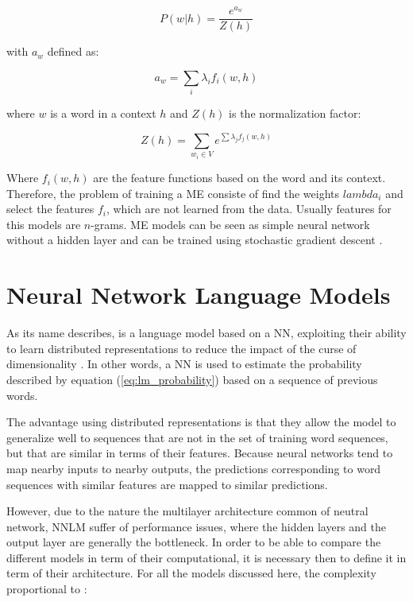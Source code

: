 \begin{equation}
  \label{eq:max-ent-prob}
   P(w|h) = \frac{e^{a_w}}{Z(h)}
\end{equation}

with $a_w$ defined as:

\begin{equation}
  \label{eq:max-ent-pro-sub1}
  a_w = \sum_{i}{\lambda_i f_i(w,h)} 
\end{equation}

where $w$ is a word in a context $h$ and $Z(h)$ is  the normalization factor:

\begin{equation}
  \label{eq:max-ent-prob-sub2}
  Z(h) = \sum_{w_i \in V}{e^{\sum{\lambda_{j} f_j(w,h)}}} 
\end{equation}

Where $f_i(w,h)$ are  the feature functions based on the word and its
context. Therefore, the problem of training a  \ac{ME} consiste of  find the
weights  $lambda_i$ and select the features $f_i$, which are not learned from
the data. Usually features for this models are $n$-grams. \ac{ME} models can
be seen as simple neural network without a hidden layer and can be trained
using stochastic gradient descent \cite{Bishop:1995:NNP:525960, mikolovphd2012}.




\section{Neural Network Language Models}
\label{sec:nnlms-intro}

As its name describes, is a language model based on a \ac{NN}, exploiting their
ability to learn distributed representations to reduce the impact of the
curse of dimensionality \cite{Bengio:2008}. In other words, a \ac{NN} is
used to estimate the probability described  by equation (\ref{eq:lm_probability}) based on a sequence of
previous words.

The advantage  using  distributed representations  is that they allow
the model to generalize well to sequences that are not in the set of training
word sequences, but that are similar in terms of their features. Because neural networks tend to map nearby inputs
to nearby outputs, the predictions corresponding to word sequences with
similar features are mapped to similar predictions. \cite{Bengio:2008,Bengio:2003:NPL:944919.944966}

However, due to the nature the multilayer architecture common of neutral
network, \ac{NNLM}  suffer of 
performance issues, where the hidden layers and the output layer are
generally the bottleneck. In order to be able to compare the different
models in term of their computational, it is necessary then to define it in
term of their architecture. For all the models discussed here, the  complexity proportional to \cite{DBLP:journals/corr/abs-1301-3781}:

